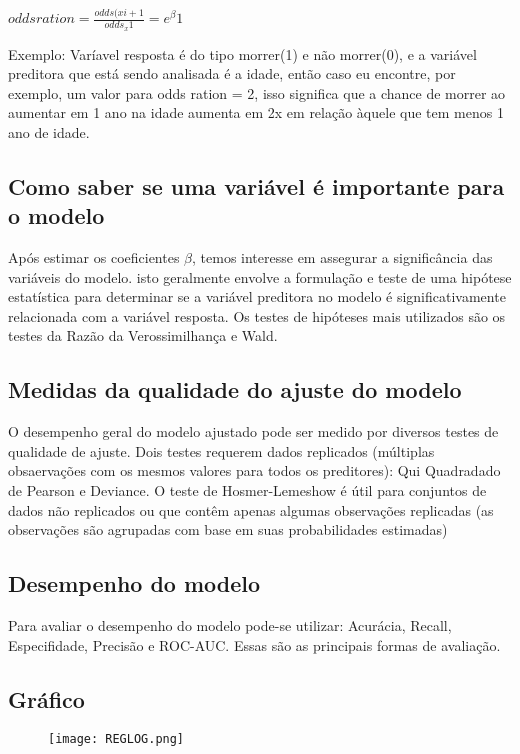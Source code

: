 \documentclass{article}
\begin{document}
$odds ration = \frac{odds(xi +1}{odds_x1} = e^\beta1 $

Exemplo: Varíavel resposta é do tipo morrer(1) e não morrer(0), e a variável preditora que está sendo analisada é a idade, então caso eu encontre, por exemplo, um valor para odds ration = 2, isso significa que a chance de morrer ao aumentar em 1 ano na idade aumenta em 2x em relação àquele que tem menos 1 ano de idade. 

\subsection{Como saber se uma variável é importante para o modelo}

Após estimar os coeficientes $\beta$, temos interesse em assegurar a significância das variáveis do modelo. isto geralmente envolve a formulação e teste de uma hipótese estatística para determinar se a variável preditora no modelo é significativamente relacionada com a variável resposta. Os testes de hipóteses mais utilizados são os testes da Razão da Verossimilhança e Wald.

\subsection{Medidas da qualidade do ajuste do modelo}

O desempenho geral do modelo ajustado pode ser medido por diversos testes de qualidade de ajuste. Dois testes requerem dados replicados (múltiplas obsaervações com os mesmos valores para todos os preditores): Qui Quadradado de Pearson e Deviance. O teste de Hosmer-Lemeshow é útil para conjuntos de dados não replicados ou que contêm apenas algumas observações replicadas (as observações são agrupadas com base em suas probabilidades estimadas)

\subsection{Desempenho do modelo}

Para avaliar o desempenho do modelo pode-se utilizar: Acurácia, Recall, Especifidade, Precisão e ROC-AUC. Essas são as principais formas de avaliação.

\subsection{Gráfico}

\begin{figure}[!h]
\texttt{[image: REGLOG.png]}
\end{figure}
\end{document}
